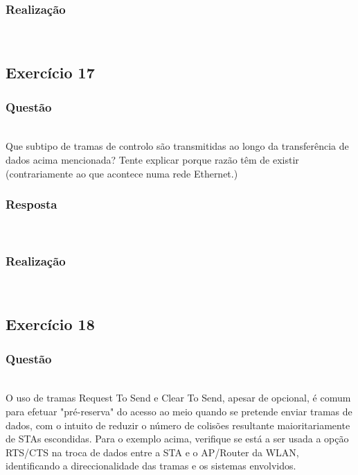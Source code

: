 \documentclass{llncs}
\begin{document}
\subsubsection{Realização}\rule[-10pt]{0pt}{10pt}\\



\clearpage
\subsection{Exercício 17}
\subsubsection{Questão}\rule[-10pt]{0pt}{10pt}\\

Que subtipo de tramas de controlo são transmitidas ao longo da transferência de dados acima mencionada? Tente explicar porque razão têm de existir (contrariamente ao que acontece numa rede Ethernet.)

\subsubsection{Resposta}\rule[-10pt]{0pt}{10pt}\\



\subsubsection{Realização}\rule[-10pt]{0pt}{10pt}\\



\clearpage
\subsection{Exercício 18}
\subsubsection{Questão}\rule[-10pt]{0pt}{10pt}\\

O uso de tramas Request To Send e Clear To Send, apesar de opcional, é comum para efetuar "pré-reserva" do acesso ao meio quando se pretende enviar tramas de dados, com o intuito de reduzir o número de colisões resultante maioritariamente de STAs escondidas. Para o exemplo acima, verifique se está a ser usada a opção RTS/CTS na troca de dados entre a STA e o AP/Router da WLAN, identificando a direccionalidade das tramas e os sistemas envolvidos.
\end{document}
